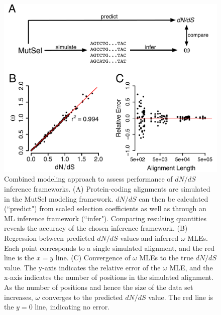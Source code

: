 \documentclass[11pt]{article}
\begin{document}
\begin{figure}[htbp]
	\centerline{\includegraphics[width=12cm]{figures/MainText/regression_convergence.pdf}}
	\caption{\label{reg_conv} Combined modeling approach to assess performance of $dN/dS$ inference frameworks. (A) Protein-coding alignments are simulated in the MutSel modeling framework. $dN/dS$ can then be calculated (``predict") from scaled selection coefficients as well as through an ML inference framework (``infer"). Comparing resulting quantities reveals the accuracy of the chosen inference framework. (B) Regression between predicted $dN/dS$ values and inferred $\omega$ MLEs. Each point corresponds to a single simulated alignment, and the red line is the $x=y$ line. (C) Convergence of $\omega$ MLEs to the true $dN/dS$ value. The y-axis indicates the relative error of the $\omega$ MLE, and the x-axis indicates the number of positions in the simulated alignment. As the number of positions and hence the size of the data set increases, $\omega$ converges to the predicted $dN/dS$ value. The red line is the $y=0$ line, indicating no error.}
\end{figure}
	
\vspace{2cm}
	
\end{document}

